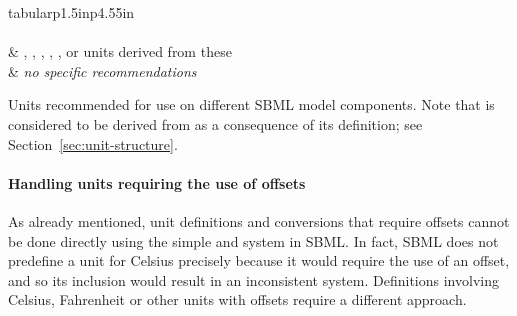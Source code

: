 \begin{table}[thb]
\begin{edtable}{tabular}{p{1.5in}p{4.55in}}
    \\
    \\
    \Species {}
    &
    , ,
    , , , or units
    derived from these
    \\[9pt]
    \Parameter {}
    &
    \emph{no specific recommendations}
    \\
    \bottomrule
  \end{edtable}
  \caption{Units recommended for use on different SBML model
    components.  Note that  is considered to be derived from
     as a consequence of its definition; see
    Section~\ref{sec:unit-structure}.}
  \label{tab:recommended-units}
\end{table}


\paragraph{Handling units requiring the use of offsets}
\label{sec:bp:unitdefinitions:offset}

As already mentioned, unit definitions and conversions that
require offsets cannot be done directly using the simple
\UnitDefinition and \Unit system in SBML.  In fact, SBML does not
predefine a unit for Celsius precisely because it would require
the use of an offset, and so its inclusion would result in an
inconsistent system.  Definitions involving Celsius, Fahrenheit or
other units with offsets require a different approach.

